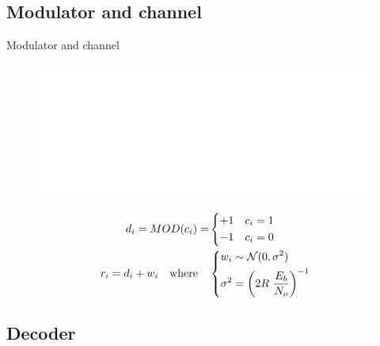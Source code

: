\documentclass{beamer}
\begin{document}
\begin{darkframes}
  \subsection{Modulator and channel}
  \begin{frame}{Modulator and channel}
    \begin{figure}[h]
      \centering
      \includegraphics{figures/channel.eps}
      \label{fig:channel_model}
    \end{figure}
    \begin{equation*}
      \begin{split}
        d_i
        = MOD(c_i)
        = & \begin{dcases}
          +1 & c_i = 1 \\
          -1 & c_i = 0
        \end{dcases} \\
        r_i
        = d_i + w_i \quad\text{where}\quad
        & \begin{dcases}
          w_i \sim \mathcal{N}(0, \sigma^2) \\
          \sigma^2 = \left( 2R~ \frac{E_b}{N_o} \right)^{-1}
        \end{dcases}
      \end{split}
    \end{equation*}
  \end{frame}

  \subsection{Decoder}



\end{darkframes}
\end{document}
